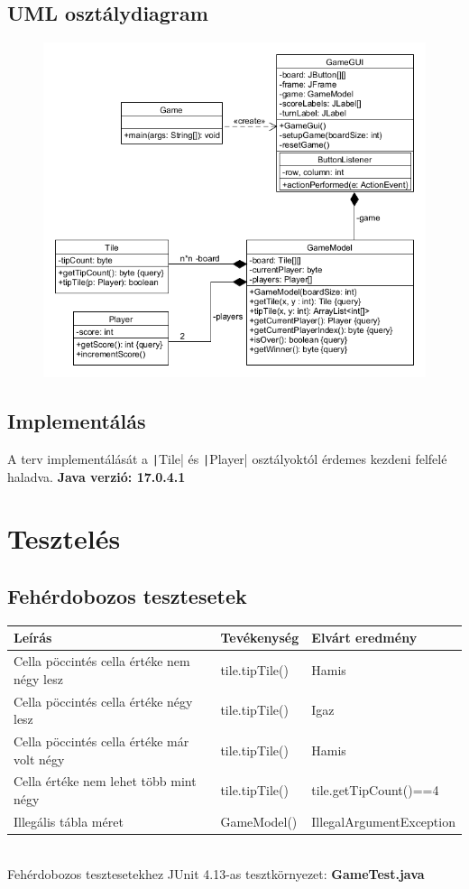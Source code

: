 \documentclass[a4paper,12pt]{article}
\begin{document}
	\subsection{UML osztálydiagram}
	\begin{figure}[H]
		\centering
		\includegraphics[scale=0.6]{class.png}
	\end{figure}
	\subsection{Implementálás}
	A terv implementálását a \texttt|Tile| és \texttt|Player| osztályoktól érdemes kezdeni felfelé haladva.
	\textbf{Java verzió: 17.0.4.1}
	\newpage
	\section{Tesztelés}
	\subsection{Fehérdobozos tesztesetek}
	\begin{tabularx}{\textwidth}{|Y|Y|Y|}
		\hline
		Leírás & Tevékenység & Elvárt eredmény \\
		\hline
		Cella pöccintés cella értéke nem négy lesz & tile.tipTile() & Hamis \\
		\hline
		Cella pöccintés cella értéke négy lesz & tile.tipTile() & Igaz \\
		\hline
		Cella pöccintés cella értéke már volt négy & tile.tipTile() & Hamis \\
		\hline
		Cella értéke nem lehet több mint négy& tile.tipTile() & tile.getTipCount()==4 \\
		\hline
		Illegális tábla méret & GameModel() & IllegalArgumentException \\
		\hline
	\end{tabularx}
	\\[4pt]
	Fehérdobozos tesztesetekhez JUnit 4.13-as tesztkörnyezet: \textbf{GameTest.java}
\end{document}
